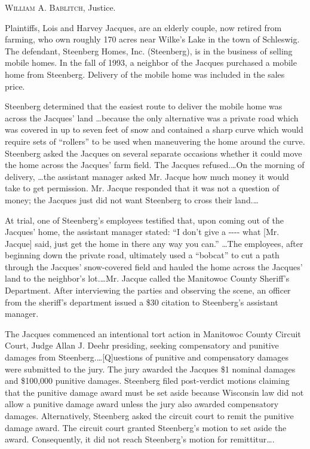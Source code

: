 
\opinion \textsc{William A. Bablitch}, Justice.

Plaintiffs, Lois and Harvey Jacques, are an elderly couple, now retired from
farming, who own roughly 170 acres near Wilke's Lake in the town of Schleswig.
The defendant, Steenberg Homes, Inc. (Steenberg), is in the business of selling
mobile homes. In the fall of 1993, a neighbor of the Jacques purchased a mobile
home from Steenberg. Delivery of the mobile home was included in the sales
price.

Steenberg determined that the easiest route to deliver the mobile home was
across the Jacques' land \ldots because the only alternative was a private
road which was covered in up to seven feet of snow and contained a sharp curve
which would require sets of ``rollers'' to be used when maneuvering the home
around the curve. Steenberg asked the Jacques on several separate occasions
whether it could move the home across the Jacques' farm field. The Jacques
refused.\ldots On the morning of delivery, \ldots the assistant manager
asked Mr. Jacque how much money it would take to get permission. Mr. Jacque
responded that it was not a question of money; the Jacques just did not want
Steenberg to cross their land.\ldots

At trial, one of Steenberg's employees testified that, upon coming out of the
Jacques' home, the assistant manager stated: ``I don't give a -{}-{}-{}- what
[Mr. Jacque] said, just get the home in there any way you can.'' \ldots The
employees, after beginning down the private road, ultimately used a ``bobcat''
to cut a path through the Jacques' snow-covered field and hauled the home
across the Jacques' land to the neighbor's lot.\ldots Mr. Jacque called the
Manitowoc County Sheriff's Department. After interviewing the parties and
observing the scene, an officer from the sheriff's department issued a \$30
citation to Steenberg's assistant manager.

The Jacques commenced an intentional tort action in Manitowoc County Circuit
Court, Judge Allan J. Deehr presiding, seeking compensatory and punitive
damages from Steenberg.\ldots[Q]uestions of punitive and compensatory damages
were submitted to the jury. The jury awarded the Jacques \$1 nominal damages
and \$100,000 punitive damages. Steenberg filed post-verdict motions claiming
that the punitive damage award must be set aside because Wisconsin law did not
allow a punitive damage award unless the jury also awarded compensatory
damages. Alternatively, Steenberg asked the circuit court to remit the punitive
damage award. The circuit court granted Steenberg's motion to set aside the
award. Consequently, it did not reach Steenberg's motion for remittitur\ldots.

